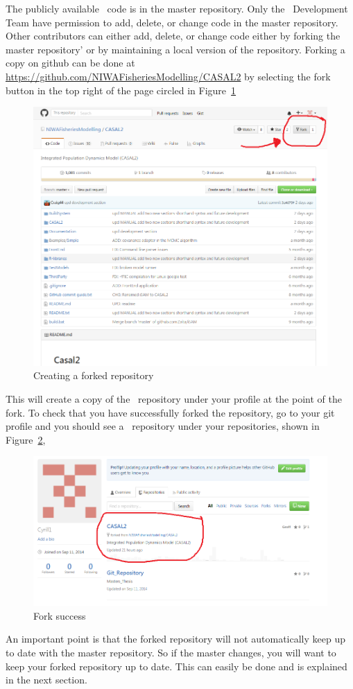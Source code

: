 The publicly available \CNAME\ code is in the master repository. Only the \CNAME\ Development Team have permission to add, delete, or change code in the master repository. Other contributors can either add, delete, or change code either by forking the master repository' or by maintaining a local version of the repository. Forking a copy on github can be done at \url{https://github.com/NIWAFisheriesModelling/CASAL2} by selecting the fork button in the top right of the page circled in Figure~\ref{fig:fork}

\begin{figure}[!H]
	\centering
	\includegraphics[scale=0.6]{Figures/Fork_button.png}
	\caption{Creating a forked repository}\label{fig:fork}
\end{figure}
\pagebreak

This will create a copy of the \CNAME\ repository under your profile at the point of the fork. To check that you have successfully forked the repository, go to your git profile and you should see a \CNAME\ repository under your repositories, shown in Figure~\ref{fig:fork_success},

\begin{figure}[!H]
	\centering
	\includegraphics[scale=0.6]{Figures/Fork_success.png}
	\caption{Fork success}\label{fig:fork_success}
\end{figure}

An important point is that the forked repository will not automatically keep up to date with the master repository. So if the master changes, you will want to keep your forked repository up to date. This can easily be done and is explained in the next section.


